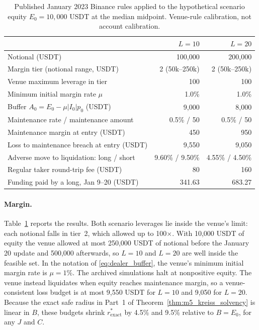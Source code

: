 \documentclass[12pt]{article}
\theoremstyle{definition}
\theoremstyle{remark}
\begin{document}
\begin{table}[tbp]\centering\small
\caption{Published January 2023 Binance rules applied to the hypothetical scenario equity $E_0=10{,}000$ USDT at the median midpoint. Venue-rule calibration, not account calibration.}
\label{iatab:venue_rules}
\begin{tabular}{lrr}
\toprule
 & $L=10$ & $L=20$ \\
\midrule
Notional (USDT) & 100,000 & 200,000 \\
Margin tier (notional range, USDT) & 2 (50k--250k) & 2 (50k--250k) \\
Venue maximum leverage in tier & 100 & 100 \\
Minimum initial margin rate $\mu$ & 1.0\% & 1.0\% \\
Buffer $A_0=E_0-\mu|I_0|p_0$ (USDT) & 9,000 & 8,000 \\
Maintenance rate / maintenance amount & 0.5\% / 50 & 0.5\% / 50 \\
Maintenance margin at entry (USDT) & 450 & 950 \\
Loss to maintenance breach at entry (USDT) & 9,550 & 9,050 \\
Adverse move to liquidation: long / short & 9.60\% / 9.50\% & 4.55\% / 4.50\% \\
Regular taker round-trip fee (USDT) & 80 & 160 \\
Funding paid by a long, Jan 9--20 (USDT) & 341.63 & 683.27 \\
\bottomrule
\end{tabular}
\end{table}

\paragraph{Margin.} Table~\ref{iatab:venue_rules} reports the results. Both scenario leverages lie inside the venue's limit: each notional falls in tier~2, which allowed up to 100$\times$. With 10,000 USDT of equity the venue allowed at most 250,000 USDT of notional before the January 20 update and 500,000 afterwards, so $L=10$ and $L=20$ are well inside the feasible set. In the notation of \eqref{eq:dealer_buffer}, the venue's minimum initial margin rate is $\mu=1\%$. The archived simulations halt at nonpositive equity. The venue instead liquidates when equity reaches maintenance margin, so a venue-consistent loss budget is at most 9,550 USDT for $L=10$ and 9,050 for $L=20$. Because the exact safe radius in Part~1 of Theorem~\ref{thm:m5_kreiss_solvency} is linear in $B$, these budgets shrink $r^*_{\text{exact}}$ by 4.5\% and 9.5\% relative to $B=E_0$, for any $J$ and $C$.
\end{document}
